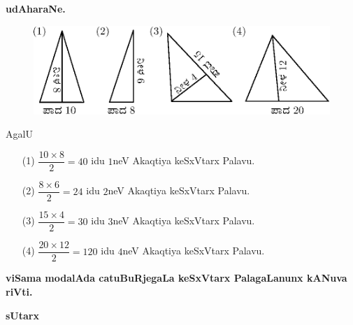 \begin{center}
{\bf udAharaNe.}
\end{center}

\begin{figure}[H]
\centering
\includegraphics{figure/fig20.eps}
\end{figure}

AgalU
\begin{itemize}
\item[\rm(1)] $\dfrac{10\times 8}{2}=40$ idu $1$neV Akaqtiya keSxVtarx Palavu.

\item[\rm(2)] $\dfrac{8\times 6}{2}=24$ idu $2$neV Akaqtiya keSxVtarx Palavu.

\item[\rm(3)] $\dfrac{15\times 4}{2}=30$ idu $3$neV Akaqtiya keSxVtarx Palavu.

\item[\rm(4)] $\dfrac{20\times 12}{2}=120$ idu $4$neV Akaqtiya
  keSxVtarx Palavu.
\end{itemize}

\newpage

\begin{center}
{\large\bf viSama modalAda catuBuRjegaLa keSxVtarx PalagaLanunx kANuva
  riVti.}
\medskip

{\large\bf sUtarx}
\end{center}

